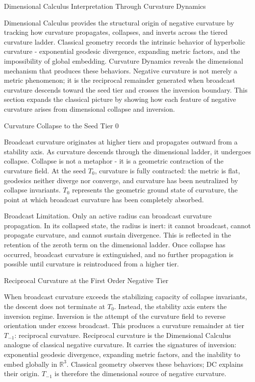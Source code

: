 \documentclass[final,onefignum,onetabnum]{siamart}
\begin{document}
\begin{section}{Dimensional Calculus Interpretation Through Curvature Dynamics}

Dimensional Calculus provides the structural origin of negative curvature by tracking how curvature propagates, collapses, and inverts across the tiered curvature ladder. Classical geometry records the intrinsic behavior of hyperbolic curvature - exponential geodesic divergence, expanding metric factors, and the impossibility of global embedding. Curvature Dynamics reveals the dimensional mechanism that produces these behaviors. Negative curvature is not merely a metric phenomenon; it is the reciprocal remainder generated when broadcast curvature descends toward the seed tier and crosses the inversion boundary. This section expands the classical picture by showing how each feature of negative curvature arises from dimensional collapse and inversion.

\begin{subsection}{Curvature Collapse to the Seed Tier 0}

Broadcast curvature originates at higher tiers and propagates outward from a stability axis. As curvature descends through the dimensional ladder, it undergoes collapse. Collapse is not a metaphor - it is a geometric contraction of the curvature field. At the seed $T_0$, curvature is fully contracted: the metric is flat, geodesics neither diverge nor converge, and curvature has been neutralized by collapse invariants. $T_0$ represents the geometric ground state of curvature, the point at which broadcast curvature has been completely absorbed.

Broadcast Limitation. Only an active radius can broadcast curvature propagation. In its collapsed state, the radius is inert: it cannot broadcast, cannot propagate curvature, and cannot sustain divergence. This is reflected in the retention of the zeroth term on the dimensional ladder. Once collapse has occurred, broadcast curvature is extinguished, and no further propagation is possible until curvature is reintroduced from a higher tier.
\end{subsection}

\begin{subsection}{Reciprocal Curvature at the First Order Negative Tier}

When broadcast curvature exceeds the stabilizing capacity of collapse invariants, the descent does not terminate at $T_0$. Instead, the stability axis enters the inversion regime. Inversion is the attempt of the curvature field to reverse orientation under excess broadcast. This produces a curvature remainder at tier $T_{-1}$: reciprocal curvature. Reciprocal curvature is the Dimensional Calculus analogue of classical negative curvature. It carries the signatures of inversion: exponential geodesic divergence, expanding metric factors, and the inability to embed globally in $\mathbb{R}^3$. Classical geometry observes these behaviors; DC explains their origin. $T_{-1}$ is therefore the dimensional source of negative curvature.
\end{subsection}


\end{section}
\end{document}
